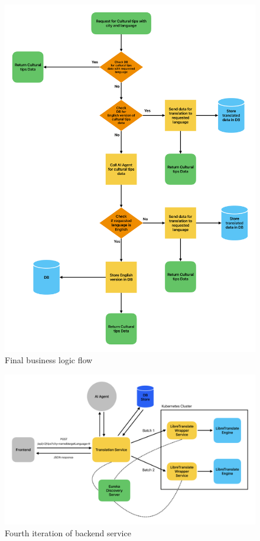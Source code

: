 \begin{figure}[H]
    \centering
    \includegraphics[width=1\linewidth]{images/Backend_Documents/Business_Logic_Flow.pdf}
    \caption{Final business logic flow}
    \label{fig:backend_business_logic _flow}
\end{figure}



\begin{figure}[H]
    \centering
    \includegraphics[width=1\linewidth]{images/Backend_Documents/Backend_Iteration_4.pdf}
    \caption{Fourth iteration of backend service}
    \label{fig:backend_iteration_4}
\end{figure}